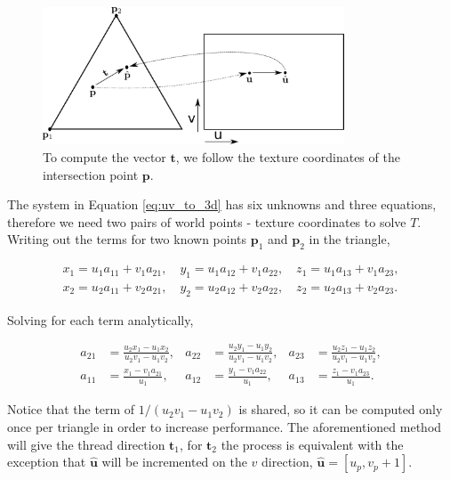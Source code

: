 \documentclass[12pt]{article}
\newcommand{\tb}{\mathbf{t}}
\begin{document}
\begin{figure}[htbp!]
\centering
\includegraphics[width=0.8\textwidth]{images/thread_3d_coord}
	\caption{To compute the vector $\tb$, we follow the texture coordinates of the intersection point $\mathbf{p}$.}
	\label{fig:thread_uv_coord}
\end{figure}

The system in Equation \ref{eq:uv_to_3d} has six unknowns and three equations, therefore we need two pairs of world points - texture coordinates to solve $T$.
Writing out the terms for two known points $\mathbf{p}_1$ and $\mathbf{p}_2$ in the triangle,

\begin{equation}
\begin{split}
x_1 = u_1 a_{11} + v_1 a_{21}, \quad y_1 = u_1 a_{12} + v_1 a_{22}, \quad z_1 = u_1 a_{13} + v_1 a_{23},\\
x_2 = u_2 a_{11} + v_2 a_{21}, \quad y_2 = u_2 a_{12} + v_2 a_{22}, \quad z_2 = u_2 a_{13} + v_2 a_{23}.
\end{split}
\end{equation}

Solving for each term analytically,

\begin{align}
a_{21}& = \frac{u_2 x_1 - u_1 x_2}{u_2 v_1 - u_1 v_2},& a_{22}& = \frac{u_2 y_1 - u_1 y_2}{u_2 v_1 - u_1 v_2},& a_{23}& = \frac{u_2 z_1 - u_1 z_2}{u_2 v_1 - u_1 v_2}, \\
a_{11}& = \frac{x_1 - v_1 a_{21}}{u_1},& a_{12}& = \frac{y_1 - v_1 a_{22}}{u_1},&  a_{13}& = \frac{z_1 - v_1 a_{23}}{u_1}.
\end{align}

Notice that the term of $1/(u_2 v_1 - u_1 v_2)$ is shared, so it can be computed only once per triangle in order to increase performance.
The aforementioned method will give the thread direction $\tb_1$, for $\tb_2$ the process is equivalent with the exception that $\hat{\mathbf{u}}$ will be incremented on the $v$ direction, $\hat{\mathbf{u}} = \left[ u_p, v_p + 1\right]$.
\end{document}
